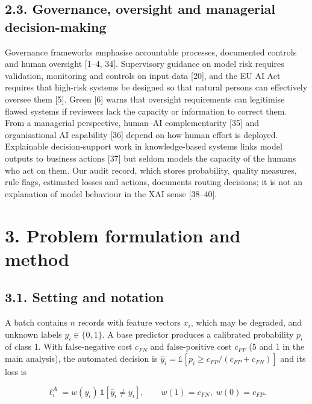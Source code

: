 \documentclass[
  11pt,
]{article}
\begin{document}
\hypertarget{governance-oversight-and-managerial-decision-making}{%
\subsection{2.3. Governance, oversight and managerial
decision-making}\label{governance-oversight-and-managerial-decision-making}}

Governance frameworks emphasise accountable processes, documented
controls and human oversight {[}1--4, 34{]}. Supervisory guidance on
model risk requires validation, monitoring and controls on input data
{[}20{]}, and the EU AI Act requires that high-risk systems be designed
so that natural persons can effectively oversee them {[}5{]}. Green
{[}6{]} warns that oversight requirements can legitimise flawed systems
if reviewers lack the capacity or information to correct them. From a
managerial perspective, human--AI complementarity {[}35{]} and
organisational AI capability {[}36{]} depend on how human effort is
deployed. Explainable decision-support work in knowledge-based systems
links model outputs to business actions {[}37{]} but seldom models the
capacity of the humans who act on them. Our audit record, which stores
probability, quality measures, rule flags, estimated losses and actions,
documents routing decisions; it is not an explanation of model behaviour
in the XAI sense {[}38--40{]}.

\hypertarget{problem-formulation-and-method}{%
\section{3. Problem formulation and
method}\label{problem-formulation-and-method}}

\hypertarget{setting-and-notation}{%
\subsection{3.1. Setting and notation}\label{setting-and-notation}}

A batch contains \(n\) records with feature vectors \(x_i\), which may
be degraded, and unknown labels \(y_i\in\{0,1\}\). A base predictor
produces a calibrated probability \(p_i\) of class 1. With
false-negative cost \(c_{FN}\) and false-positive cost \(c_{FP}\) (5 and
1 in the main analysis), the automated decision is
\(\hat y_i = \mathbb{1}[p_i \ge c_{FP}/(c_{FP}+c_{FN})]\) and its loss
is

\[\ell^A_i = w(y_i)\,\mathbb{1}[\hat y_i \ne y_i], \qquad w(1)=c_{FN},\; w(0)=c_{FP}. \tag{1}\]
\end{document}
